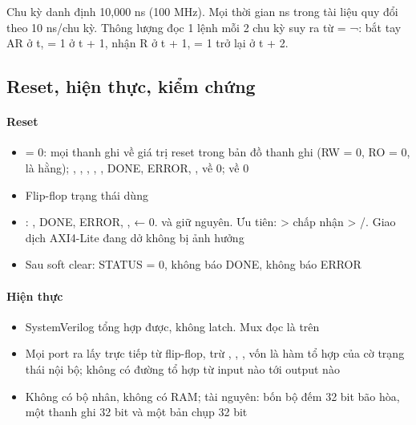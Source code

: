 \documentclass[10pt,a4paper]{article}
\begin{document}
\begin{notebox}
Chu kỳ danh định 10,000 ns (100 MHz). Mọi thời gian ns trong tài liệu quy đổi theo 10 ns/chu kỳ. Thông lượng đọc 1 lệnh mỗi 2 chu kỳ suy ra từ  = ¬: bắt tay AR ở t,  = 1 ở t + 1, nhận R ở t + 1,  = 1 trở lại ở t + 2.
\end{notebox}

\subsection{Reset, hiện thực, kiểm chứng}\label{sec:7}

\paragraph{Reset}\label{par:7-1}
\begin{itemize}
\item {} = 0: mọi thanh ghi về giá trị reset trong bản đồ thanh ghi (RW = 0, RO = 0,  là hằng); , , , , , DONE, ERROR, ,  về 0;  về 0
\item Flip-flop trạng thái dùng 
\item {}: , DONE, ERROR, ,  ← 0.  và  giữ nguyên. Ưu tiên:  > chấp nhận > /. Giao dịch AXI4-Lite đang dở không bị ảnh hưởng
\item Sau soft clear: STATUS = 0, không báo DONE, không báo ERROR
\end{itemize}

\paragraph{Hiện thực}\label{par:7-2}
\begin{itemize}
\item SystemVerilog tổng hợp được, không latch. Mux đọc là  trên 
\item Mọi port ra lấy trực tiếp từ flip-flop, trừ , , , vốn là hàm tổ hợp của cờ trạng thái nội bộ; không có đường tổ hợp từ input nào tới output nào
\item Không có bộ nhân, không có RAM; tài nguyên: bốn bộ đếm 32 bit bão hòa, một thanh ghi 32 bit  và một bản chụp 32 bit
\end{itemize}
\end{document}
